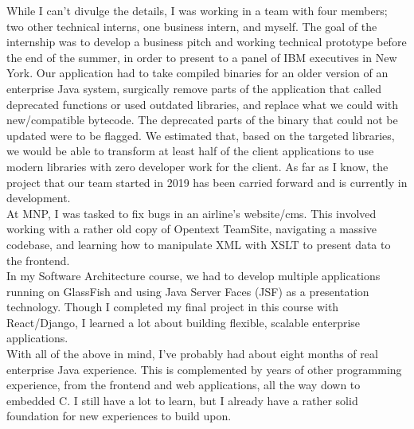 \documentclass[]{rcf_cv}
\begin{document}
	While I can't divulge the details, I was working in a team with four members; two other technical 
	interns, one business intern, and myself. The goal of the internship was to develop a business pitch
	and working technical prototype before the end of the summer, in order to present to a panel of
	IBM executives in New York. Our application had to take compiled binaries for an older version of
	an enterprise Java system, surgically remove parts of the application that called deprecated functions
	or used outdated libraries, and replace what we could with new/compatible bytecode. The deprecated
	parts of the binary that could not be updated were to be flagged. We estimated that, based on the
	targeted libraries, we would be able to transform at least half of the client applications to
	use modern libraries with zero developer work for the client. As far as I know, the project that
	our team started in 2019 has been carried forward and is currently in development. \\
	
	At MNP, I was tasked to fix bugs in an airline's website/cms. This involved working with a rather
	old copy of Opentext TeamSite, navigating a massive codebase, and learning how to manipulate XML with
	XSLT to present data to the frontend. \\
	
	In my Software Architecture course, we had to develop multiple applications running on GlassFish and
	using Java Server Faces (JSF) as a presentation technology. Though I completed my final project in 
	this course with React/Django, I learned a lot about building flexible, scalable 
	enterprise applications. \\
	
	With all of the above in mind, I've probably had about eight months of real enterprise Java experience.
	This is complemented by years of other programming experience, from the frontend and web applications, 
	all the way down to embedded C. I still have a lot to learn, but I already have a rather solid 
	foundation for new experiences to build upon.

	
	
	
	
\end{document}

